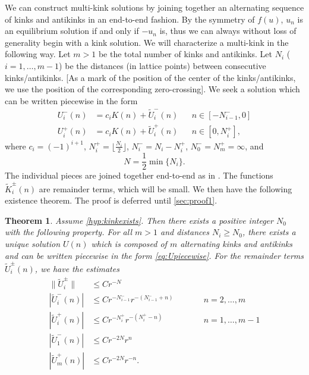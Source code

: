 \documentclass[12pt,reqno]{amsart}
\newtheorem{theorem}{Theorem}
\begin{document}
We can construct multi-kink solutions by joining together an alternating sequence of kinks and antikinks in an end-to-end fashion. By the symmetry of $f(u)$, $u_n$ is an equilibrium solution if and only if $-u_n$ is, thus we can always without loss of generality begin with a kink solution. We will characterize a multi-kink in the following way. Let $m > 1$ be the total number of kinks and antikinks. Let $N_i$ ($i = 1, \dots, m-1$) be the distances (in lattice points) between consecutive kinks/antikinks.
[As a mark of the position of the center of the kinks/antikinks,
we use the position of the corresponding zero-crossing].
We seek a solution which can be written piecewise in the form 
\begin{equation}\label{eq:Upiecewise}
\begin{aligned}
U_i^-(n) &= c_i K(n) + \tilde{U}_i^-(n) && n \in [-N_{i-1}^-, 0] \\
U_i^+(n) &= c_i K(n) + \tilde{U}_i^+(n) && n \in [0, N_i^+],
\end{aligned}
\end{equation}
where $c_i = (-1)^{i+1}$, $N_i^+ = \lfloor \frac{N_i}{2} \rfloor$, $N_i^- = N_i - N_i^+$, $N_0^- = N_m^+ = \infty$, and
\begin{equation}\label{defN}
N = \frac{1}{2} \min\{ N_i \}.
\end{equation}
The individual pieces are joined together end-to-end as in \cites{Sandstede1998,Parker2020}. The functions $\tilde{K}_i^\pm(n)$ are remainder terms, which will be small. We then have the following existence theorem. The proof is deferred until \cref{sec:proof1}.

\begin{theorem}\label{th:KaKexists}
Assume \cref{hyp:kinkexists}. Then there exists a positive integer $N_0$ with the following property. For all $m > 1$ and distances $N_i \geq N_0$, there exists a unique solution $U(n)$ which is composed of $m$ alternating kinks and antikinks and can be written piecewise in the form \cref{eq:Upiecewise}. For the remainder terms $\tilde{U}_i^\pm(n)$, we have the estimates
\begin{equation}\label{eq:Uestimates}
\begin{aligned}
\|\tilde{U}_i^\pm\| &\leq C r^{-N} \\
| \tilde{U}_i^-(n) | &\leq C r^{-N_{i-1}^-} r^{-(N_{i-1}^- + n)} && \qquad n = 2, \dots, m\\
|\tilde{U}_i^+(n)| &\leq C r^{-N_i^+} r^{-(N_i^+ - n)} && \qquad n = 1, \dots, m-1 \\
| \tilde{U}_1^-(n) | &\leq C r^{-2N} r^{n} \\
|\tilde{U}_m^+(n)| &\leq C r^{-2N} r^{-n} .
\end{aligned}
\end{equation}
\end{theorem}
\end{document}

